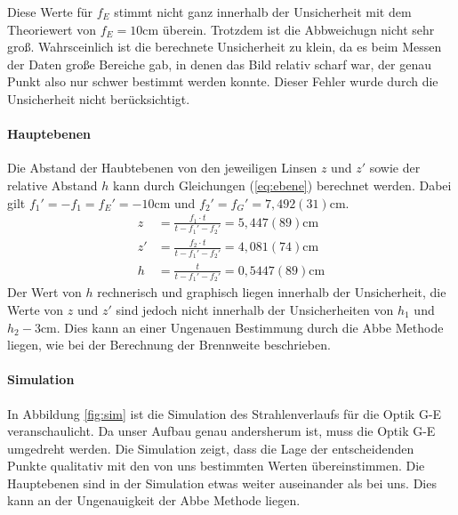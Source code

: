 \documentclass[11pt, a4paper]{article}
\begin{document}
    Diese Werte für $f_E$ stimmt nicht ganz innerhalb der Unsicherheit mit dem Theoriewert von $f_E = 10 \si{\centi\metre}$ überein. Trotzdem ist die Abbweichugn nicht sehr groß. Wahrsceinlich ist die berechnete Unsicherheit zu klein, da es beim Messen der Daten große Bereiche gab, in denen das Bild relativ scharf war, der genau Punkt also nur schwer bestimmt werden konnte. Dieser Fehler wurde durch die Unsicherheit nicht berücksichtigt.

    \paragraph{Hauptebenen}
    Die Abstand der Haubtebenen von den jeweiligen Linsen $z$ und $z'$ sowie der relative Abstand $h$ kann durch Gleichungen (\ref{eq:ebene}) berechnet werden. Dabei gilt $f_1' = -f_1 = f_E' = -10 \si{\centi\metre}$ und $f_2' = f_G' = 7,492(31) \si{\centi\metre}$.
    \begin{align}
        z &= \frac{f_1 \cdot t}{t - f_1' - f_2'} = 5,447(89) \si{\centi\metre} \\
        z' &= \frac{f_2 \cdot t}{t - f_1' - f_2'} = 4,081(74) \si{\centi\metre} \\
        h &= \frac{t}{t - f_1' - f_2'} = 0,5447(89) \si{\centi\metre}
    \end{align}
    Der Wert von $h$ rechnerisch und graphisch liegen innerhalb der Unsicherheit, die Werte von $z$ und $z'$ sind jedoch nicht innerhalb der Unsicherheiten von $h_1$ und $h_2 - 3 \si{\centi\metre}$. Dies kann an einer Ungenauen Bestimmung durch die Abbe Methode liegen, wie bei der Berechnung der Brennweite beschrieben.

    \paragraph{Simulation}
    In Abbildung \ref{fig:sim} ist die Simulation des Strahlenverlaufs für die Optik G-E veranschaulicht. Da unser Aufbau genau andersherum ist, muss die Optik G-E umgedreht werden. Die Simulation zeigt, dass die Lage der entscheidenden Punkte qualitativ mit den von uns bestimmten Werten übereinstimmen. Die Hauptebenen sind in der Simulation etwas weiter auseinander als bei uns. Dies kann an der Ungenauigkeit der Abbe Methode liegen.
\end{document}
